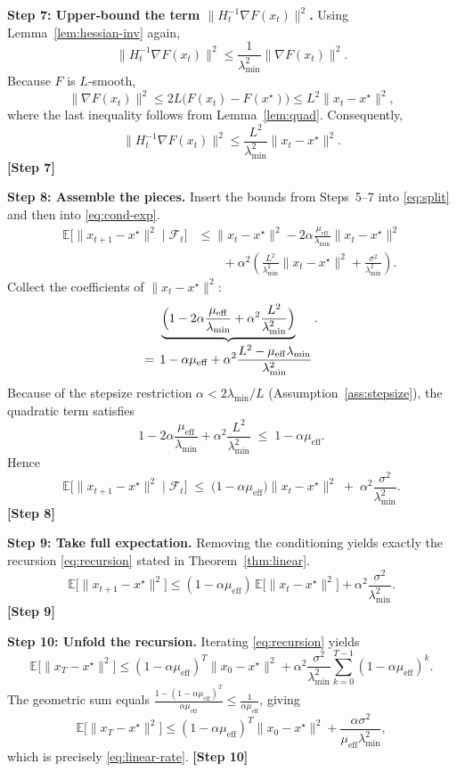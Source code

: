 \documentclass{article}
\begin{document}
\bigskip
\noindent\textbf{Step 7: Upper‑bound the term $\|H_t^{-1}\nabla F(x_t)\|^2$.}
Using Lemma~\ref{lem:hessian-inv} again,
\[
\|H_t^{-1}\nabla F(x_t)\|^2
\le \frac{1}{\lambda_{\min}^2}\|\nabla F(x_t)\|^2 .
\]
Because $F$ is $L$‑smooth,
\[
\|\nabla F(x_t)\|^2 \le 2L\big(F(x_t)-F(x^\star)\big)
\le L^2\|x_t-x^\star\|^2,
\]
where the last inequality follows from Lemma~\ref{lem:quad}. Consequently,
\[
\|H_t^{-1}\nabla F(x_t)\|^2 \le \frac{L^2}{\lambda_{\min}^2}\|x_t-x^\star\|^2 .
\]
\textbf{[Step 7]}

\bigskip
\noindent\textbf{Step 8: Assemble the pieces.}  
Insert the bounds from Steps~5–7 into \eqref{eq:split} and then into \eqref{eq:cond-exp}.
\begin{align}
\mathbb{E}\!\big[\|x_{t+1}-x^\star\|^2\mid\mathcal{F}_t\big]
&\le \|x_t-x^\star\|^2
   -2\alpha\frac{\mu_{\mathrm{eff}}}{\lambda_{\min}}\|x_t-x^\star\|^2 \nonumber\\
&\qquad
   +\alpha^2\left(\frac{L^2}{\lambda_{\min}^2}\|x_t-x^\star\|^2
   +\frac{\sigma^2}{\lambda_{\min}^2}\right) .
\end{align}
Collect the coefficients of $\|x_t-x^\star\|^2$:
\[
\underbrace{\Bigl(1-2\alpha\frac{\mu_{\mathrm{eff}}}{\lambda_{\min}}+\alpha^2\frac{L^2}{\lambda_{\min}^2}\Bigr)}_{\displaystyle =\,1-\alpha\mu_{\mathrm{eff}}+\alpha^2\frac{L^2-\mu_{\mathrm{eff}}\lambda_{\min}}{\lambda_{\min}^2}}.
\]
Because of the stepsize restriction $\alpha<2\lambda_{\min}/L$ (Assumption~\ref{ass:stepsize}), the quadratic term satisfies
\[
1-2\alpha\frac{\mu_{\mathrm{eff}}}{\lambda_{\min}}+\alpha^2\frac{L^2}{\lambda_{\min}^2}
\;\le\; 1-\alpha\mu_{\mathrm{eff}} .
\]
Hence
\begin{equation}
\mathbb{E}\!\big[\|x_{t+1}-x^\star\|^2\mid\mathcal{F}_t\big]
\;\le\;
\big(1-\alpha\mu_{\mathrm{eff}}\big)\|x_t-x^\star\|^2
\;+\;
\alpha^2\frac{\sigma^2}{\lambda_{\min}^2}.
\label{eq:one-step}
\end{equation}
\textbf{[Step 8]}

\bigskip
\noindent\textbf{Step 9: Take full expectation.}  
Removing the conditioning yields exactly the recursion \eqref{eq:recursion} stated in Theorem~\ref{thm:linear}.
\[
\mathbb{E}\!\big[\|x_{t+1}-x^\star\|^2\big]
\le (1-\alpha\mu_{\mathrm{eff}})\,\mathbb{E}\!\big[\|x_t-x^\star\|^2\big]
   +\alpha^2\frac{\sigma^2}{\lambda_{\min}^2}.
\]
\textbf{[Step 9]}

\bigskip
\noindent\textbf{Step 10: Unfold the recursion.}  
Iterating \eqref{eq:recursion} yields
\[
\mathbb{E}\!\big[\|x_T-x^\star\|^2\big]
\le (1-\alpha\mu_{\mathrm{eff}})^T\|x_0-x^\star\|^2
   +\alpha^2\frac{\sigma^2}{\lambda_{\min}^2}
     \sum_{k=0}^{T-1}(1-\alpha\mu_{\mathrm{eff}})^k .
\]
The geometric sum equals $\frac{1-(1-\alpha\mu_{\mathrm{eff}})^T}{\alpha\mu_{\mathrm{eff}}}\le\frac{1}{\alpha\mu_{\mathrm{eff}}}$, giving
\[
\mathbb{E}\!\big[\|x_T-x^\star\|^2\big]
\le (1-\alpha\mu_{\mathrm{eff}})^T\|x_0-x^\star\|^2
   +\frac{\alpha\sigma^2}{\mu_{\mathrm{eff}}\lambda_{\min}^2},
\]
which is precisely \eqref{eq:linear-rate}.
\textbf{[Step 10]}
\end{document}
